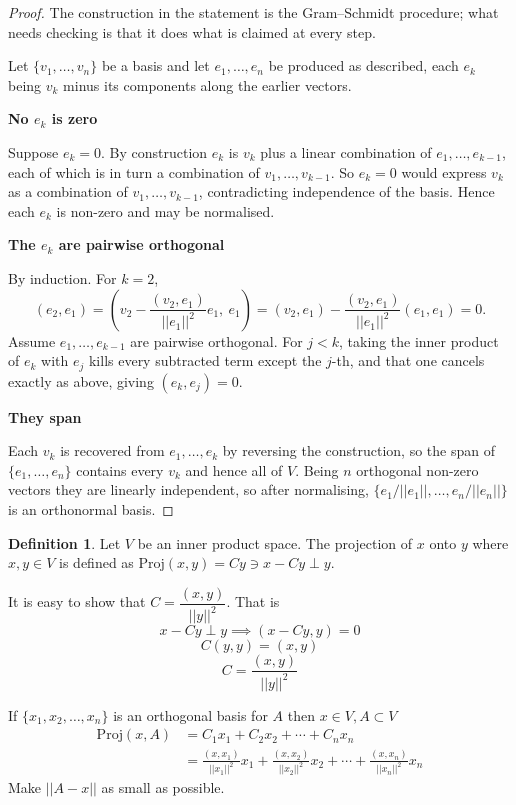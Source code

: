 \documentclass[11pt,a4paper]{article}
\theoremstyle{definition}
\newtheorem{defn}[thm]{Definition}
\newcommand{\subhead}[1]{%
  \par\medskip\noindent\textbf{#1}\par\nobreak\smallskip}
\begin{document}
\begin{proof}
The construction in the statement is the Gram--Schmidt procedure; what needs
checking is that it does what is claimed at every step.

Let $\{v_1,\dots,v_n\}$ be a basis and let $e_1,\dots,e_n$ be produced as
described, each $e_k$ being $v_k$ minus its components along the earlier
vectors.

\subhead{No $e_k$ is zero}
Suppose $e_k=0$. By construction $e_k$ is $v_k$ plus a linear combination of
$e_1,\dots,e_{k-1}$, each of which is in turn a combination of
$v_1,\dots,v_{k-1}$. So $e_k=0$ would express $v_k$ as a combination of
$v_1,\dots,v_{k-1}$, contradicting independence of the basis. Hence each $e_k$
is non-zero and may be normalised.

\subhead{The $e_k$ are pairwise orthogonal}
By induction. For $k=2$,
$$(e_2,e_1)=\left(v_2-\frac{(v_2,e_1)}{||e_1||^2}e_1,\ e_1\right)
=(v_2,e_1)-\frac{(v_2,e_1)}{||e_1||^2}(e_1,e_1)=0 .$$
Assume $e_1,\dots,e_{k-1}$ are pairwise orthogonal. For $j<k$, taking the inner
product of $e_k$ with $e_j$ kills every subtracted term except the $j$-th, and
that one cancels exactly as above, giving $(e_k,e_j)=0$.

\subhead{They span}
Each $v_k$ is recovered from $e_1,\dots,e_k$ by reversing the construction, so
the span of $\{e_1,\dots,e_n\}$ contains every $v_k$ and hence all of $V$. Being
$n$ orthogonal non-zero vectors they are linearly independent, so after
normalising, $\{e_1/||e_1||,\dots,e_n/||e_n||\}$ is an orthonormal basis.
\end{proof}

\begin{defn}
Let $V$ be an inner product space. The projection of $x$ onto $y$ where $x,y\in V$ is defined as $\text{Proj}(x,y)=Cy\ni x-Cy\perp y$.

It is easy to show that \hspace{0.3cm}$C=\dfrac{(x,y)}{||y||^2}$\hspace{0.2cm}.\hspace{0.2cm} That is $$x-Cy\perp y\implies (x-Cy,y)=0$$ $$C(y,y)=(x,y)$$ $$C=\frac{(x,y)}{||y||^2}$$


\begin{figure}[H]
\centering
{}
\end{figure}


If $\{x_1,x_2,\dots,x_n\}$ is an orthogonal basis for $A$ then $x\in V, A\subset V$
\begin{align*}
\text{Proj}(x,A) &=C_1x_1+C_2x_2+\cdots+C_nx_n\\
                   &=\frac{(x,x_1)}{||x_1||^2}x_1+\frac{(x,x_2)}{||x_2||^2}x_2+\cdots+\frac{(x,x_n)}{||x_n||^2}x_n
\end{align*}
Make $||A-x||$ as small as possible.

\end{defn}
\end{document}
